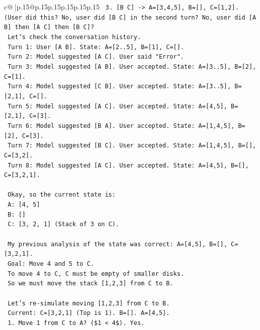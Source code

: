 \documentclass{article}
\begin{document}
{\begin{supertabular}{c@{$\;$}|p{.15\linewidth}@{}p{.15\linewidth}p{.15\linewidth}p{.15\linewidth}p{.15\linewidth}p{.15\linewidth}}
{{{\texttt{   3. {[}B C{]} {-}> A={[}3,4,5{]}, B={[}{]}, C={[}1,2{]}. (User did this? No, user did {[}B C{]} in the second turn? No, user did {[}A B{]} then {[}A C{]} then {[}B C{]}?} \\
\texttt{   Let's check the conversation history.} \\
\texttt{   Turn 1: User {[}A B{]}. State: A={[}2..5{]}, B={[}1{]}, C={[}{]}.} \\
\texttt{   Turn 2: Model suggested {[}A C{]}. User said "Error".} \\
\texttt{   Turn 3: Model suggested {[}A B{]}. User accepted. State: A={[}3..5{]}, B={[}2{]}, C={[}1{]}.} \\
\texttt{   Turn 4: Model suggested {[}C B{]}. User accepted. State: A={[}3..5{]}, B={[}2,1{]}, C={[}{]}.} \\
\texttt{   Turn 5: Model suggested {[}A C{]}. User accepted. State: A={[}4,5{]}, B={[}2,1{]}, C={[}3{]}.} \\
\texttt{   Turn 6: Model suggested {[}B A{]}. User accepted. State: A={[}1,4,5{]}, B={[}2{]}, C={[}3{]}.} \\
\texttt{   Turn 7: Model suggested {[}B C{]}. User accepted. State: A={[}1,4,5{]}, B={[}{]}, C={[}3,2{]}.} \\
\texttt{   Turn 8: Model suggested {[}A C{]}. User accepted. State: A={[}4,5{]}, B={[}{]}, C={[}3,2,1{]}.} \\
\\ 
\texttt{   Okay, so the current state is:} \\
\texttt{   A: {[}4, 5{]}} \\
\texttt{   B: {[}{]}} \\
\texttt{   C: {[}3, 2, 1{]} (Stack of 3 on C).} \\
\\ 
\texttt{   My previous analysis of the state was correct: A={[}4,5{]}, B={[}{]}, C={[}3,2,1{]}.} \\
\texttt{   Goal: Move 4 and 5 to C.} \\
\texttt{   To move 4 to C, C must be empty of smaller disks.} \\
\texttt{   So we must move the stack {[}1,2,3{]} from C to B.} \\
\\ 
\texttt{   Let's re{-}simulate moving {[}1,2,3{]} from C to B.} \\
\texttt{   Current: C={[}3,2,1{]} (Top is 1). B={[}{]}. A={[}4,5{]}.} \\
\texttt{   1. Move 1 from C to A? (\$1 < 4\$). Yes.} \\
}}}
\end{supertabular}}
\end{document}
